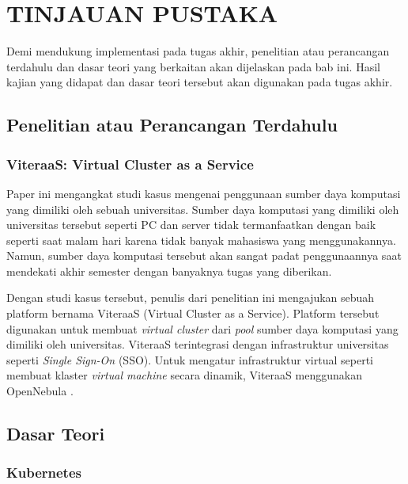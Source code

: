 \chapter{TINJAUAN PUSTAKA}
\label{chap:tinjauanpustaka}


Demi mendukung implementasi pada tugas akhir, penelitian atau perancangan terdahulu dan dasar teori
yang berkaitan akan dijelaskan pada bab ini. Hasil kajian yang didapat
dan dasar teori tersebut akan digunakan pada tugas akhir.

\section{Penelitian atau Perancangan Terdahulu}

\subsection{ViteraaS: Virtual Cluster as a Service}

Paper ini mengangkat studi kasus mengenai penggunaan sumber daya komputasi
yang dimiliki oleh sebuah universitas. Sumber daya komputasi yang dimiliki
oleh universitas tersebut seperti PC dan server tidak termanfaatkan dengan
baik seperti saat malam hari karena tidak banyak mahasiswa yang menggunakannya.
Namun, sumber daya komputasi tersebut akan sangat padat penggunaannya saat
mendekati akhir semester dengan banyaknya tugas yang diberikan.

Dengan studi kasus tersebut, penulis dari penelitian ini mengajukan sebuah
platform bernama ViteraaS (Virtual Cluster as a Service). Platform tersebut
digunakan untuk membuat \emph{virtual cluster} dari \emph{pool} sumber daya
komputasi yang dimiliki oleh universitas. ViteraaS terintegrasi dengan
infrastruktur universitas seperti \emph{Single Sign-On} (SSO). Untuk mengatur
infrastruktur virtual seperti membuat klaster \emph{virtual machine} secara dinamik,
ViteraaS menggunakan OpenNebula \parencite{6133210}.

\section{Dasar Teori}

\subsection{Kubernetes}
\label{sec:kubernetes}

